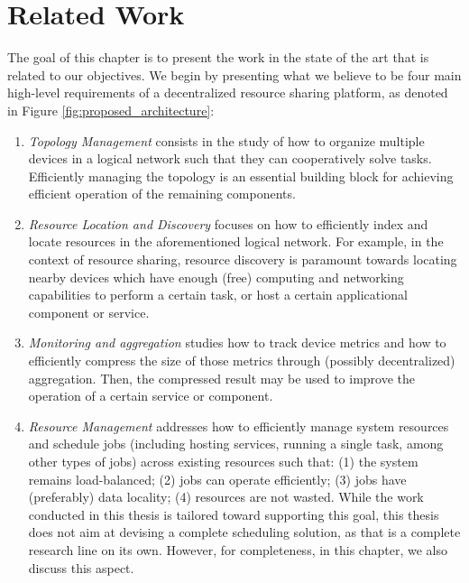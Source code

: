 \chapter{Related Work}
\label{cha:related_work}

The goal of this chapter is to present the work in the state of the art that is related to our objectives. We begin by presenting what we believe to be four main high-level requirements of a decentralized resource sharing platform, as denoted in Figure \ref{fig:proposed_architecture}:

\begin{enumerate}

    \item \textit{Topology Management} consists in the study of how to organize multiple devices in a logical network such that they can cooperatively solve tasks. Efficiently managing the topology is an essential building block for achieving efficient operation of the remaining components.

    \item \textit{Resource Location and Discovery} focuses on how to efficiently index and locate resources in the aforementioned logical network. For example, in the context of resource sharing, resource discovery is paramount towards locating nearby devices which have enough (free) computing and networking capabilities to perform a certain task, or host a certain applicational component or service.

    \item \textit{Monitoring and aggregation} studies how to track device metrics and how to efficiently compress the size of those metrics through (possibly decentralized) aggregation. Then, the compressed result may be used to improve the operation of a certain service or component.

    \item \textit{Resource Management} addresses how to efficiently manage system resources and schedule jobs (including hosting services, running a single task, among other types of jobs) across existing resources such that: (1) the system remains load-balanced; (2) jobs can operate efficiently; (3) jobs have (preferably) data locality; (4) resources are not wasted. While the work conducted in this thesis is tailored toward supporting this goal, this thesis does not aim at devising a complete scheduling solution, as that is a complete research line on its own. However, for completeness, in this chapter, we also discuss this aspect.

\end{enumerate}

